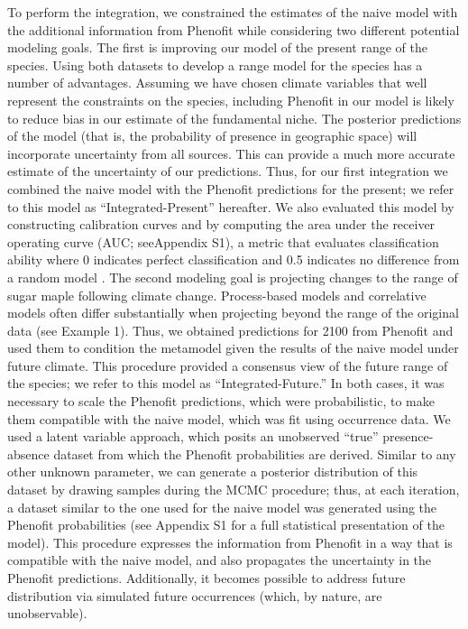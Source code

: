 \documentclass[11pt]{article}
\newcommand{\rev}[1]{{\color{RoyalBlue}#1}}
\begin{document}
To perform the integration, we constrained the estimates of the naive model with the additional information from Phenofit while considering two different potential modeling goals.
The first is improving our model of the present range of the species.
Using both datasets to develop a range model for the species has a number of advantages.
Assuming we have chosen climate variables that well represent the constraints on the species, including Phenofit in our model is likely to reduce bias in our estimate of the fundamental niche.
The posterior predictions of the model (that is, the probability of presence in geographic space) will incorporate uncertainty from all sources.
This can provide a much more accurate estimate of the uncertainty of our predictions.
Thus, for our first integration we combined the naive model with the Phenofit predictions for the present; we refer to this model as ``Integrated-Present'' hereafter.
\rev{We also evaluated this model by constructing calibration curves and by computing the area under the receiver operating curve (AUC; seeAppendix S1), a metric that evaluates classification ability where 0 indicates perfect classification and 0.5 indicates no difference from a random model \citep{Swets1988}.}
The second modeling goal is projecting changes to the range of sugar maple following climate change.
Process-based models and correlative models often differ substantially when projecting beyond the range of the original data (see Example 1).
Thus, we obtained predictions for 2100 from Phenofit \citep{Morin2009} and used them to condition the metamodel given the results of the naive model under future climate.
This procedure provided a consensus view of the future range of the species; we refer to this model as ``Integrated-Future.''
\rev{In both cases, it was necessary to scale the Phenofit predictions, which were probabilistic, to make them compatible with the naive model, which was fit using occurrence data.
We used a latent variable approach, which posits an unobserved ``true'' presence-absence dataset from which the Phenofit probabilities are derived. 
Similar to any other unknown parameter, we can generate a posterior distribution of this dataset by drawing samples during the MCMC procedure; thus, at each iteration, a dataset similar to the one used for the naive model was generated using the Phenofit probabilities (see Appendix S1 for a full statistical presentation of the model).
This procedure expresses the information from Phenofit in a way that is compatible with the naive model, and also propagates the uncertainty in the Phenofit predictions.
Additionally, it becomes possible to address future distribution via simulated future occurrences (which, by nature, are unobservable).}
\end{document}
